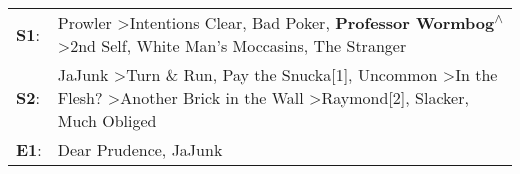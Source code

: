 \begin{supertabular}{p{0.03\textwidth}p{0.92\textwidth}}
 \textbf{S1}:  &                                                                                      Prowler\textsuperscript{} \textgreater \enspace Intentions Clear\textsuperscript{}, \enspace Bad Poker\textsuperscript{}, \enspace \textbf{Professor Wormbog\textsuperscript{$\wedge$}} \textgreater \enspace 2nd Self\textsuperscript{}, \enspace White Man's Moccasins\textsuperscript{}, \enspace The Stranger\textsuperscript{}  \enspace  \\
 \textbf{S2}:  &  JaJunk\textsuperscript{} \textgreater \enspace Turn \& Run\textsuperscript{}, \enspace Pay the Snucka[1]\textsuperscript{}, \enspace Uncommon\textsuperscript{} \textgreater \enspace In the Flesh?\textsuperscript{} \textgreater \enspace Another Brick in the Wall\textsuperscript{} \textgreater \enspace Raymond[2]\textsuperscript{}, \enspace Slacker\textsuperscript{}, \enspace Much Obliged\textsuperscript{}  \enspace  \\
 \textbf{E1}:  &                                                                                                                                                                                                                                                                                                                                                       Dear Prudence\textsuperscript{}, \enspace JaJunk\textsuperscript{}  \enspace  \\
\end{supertabular}

